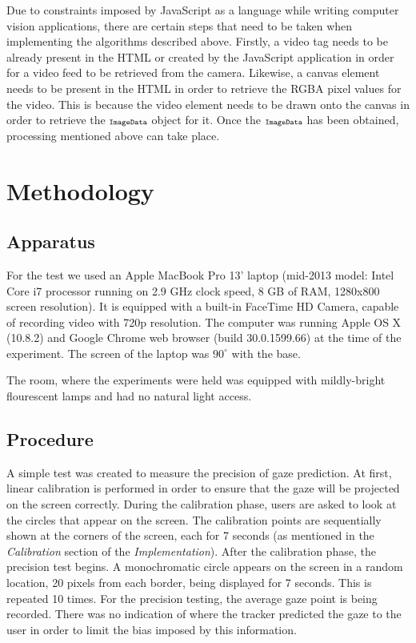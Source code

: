 \documentclass[annual]{acmsiggraph}
\newcommand{\Acronym}[1]{\ensuremath{{\small{\texttt{#1}}}}}
\begin{document}
%
%
%

Due to constraints imposed by JavaScript as a language while writing computer
vision applications, there are certain steps that need to be taken when
implementing the algorithms described above. Firstly, a video tag needs to be
already present in the HTML or created by the JavaScript application in order
for a video feed to be retrieved from the camera. Likewise, a canvas element
needs to be present in the HTML in order to retrieve the RGBA pixel values for
the video.  This is because the video element needs to be drawn onto the canvas
in order to retrieve the $\Acronym{ImageData}$ object for it. Once the
$\Acronym{ImageData}$ has been obtained, processing mentioned above can take
place.

\section{Methodology}

\subsection{Apparatus}

For the test we used an Apple MacBook Pro 13' laptop (mid-2013 model: Intel
Core i7 processor running on 2.9 GHz clock speed, 8 GB of RAM, 1280x800 screen
resolution).  It is equipped with a built-in FaceTime HD Camera, capable of
recording video with 720p resolution. The computer was running Apple OS X
(10.8.2) and Google Chrome web browser (build 30.0.1599.66) at the time of the
experiment. The screen of the laptop was $90^{\circ}$ with the base.

The room, where the experiments were held was equipped with mildly-bright
flourescent lamps and had no natural light access. 

\subsection{Procedure}

A simple test was created to measure the precision of gaze prediction. At
first, linear calibration is performed in order to ensure that the gaze will be
projected on the screen correctly. During the calibration phase, users are
asked to look at the circles that appear on the screen. The calibration points
are sequentially shown at the corners of the screen, each for 7 seconds (as
mentioned in the \emph{Calibration} section of the \emph{Implementation}).
After the calibration phase, the precision test begins. A monochromatic circle
appears on the screen in a random location, 20 pixels from each border, being
displayed for 7 seconds.  This is repeated 10 times. For the precision testing,
the average gaze point is being recorded.  There was no indication of where the
tracker predicted the gaze to the user in order to limit the bias imposed by
this information.
\end{document}
